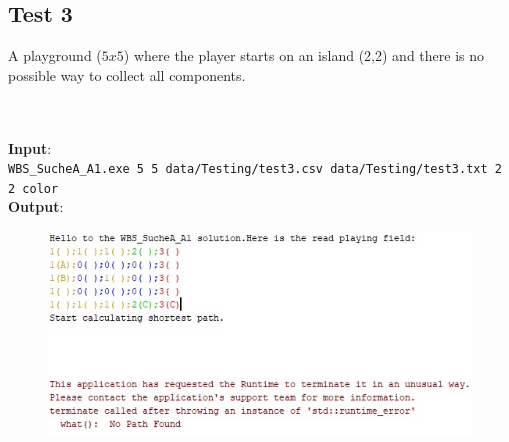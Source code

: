 \documentclass{article}
\begin{document}
\subsection{Test 3}
A  playground ($5 x 5$) where the player starts on an island (2,2) and there is no possible way to collect all components.

\\
\\
\textbf{Input}:\\
\texttt{WBS\_SucheA\_A1.exe 5 5 data/Testing/test3.csv data/Testing/test3.txt 2 2 color}\\
\textbf{Output}:
\begin{figure}[H]
\includegraphics[width=14cm]{test3}
\centering
\end{figure}
\end{document}
